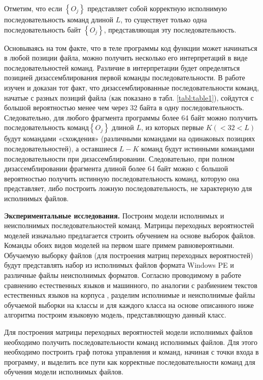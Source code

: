 \documentclass{book}
\begin{document}
Отметим, что если \( \left\lbrace O_{j} \right\rbrace \) представляет собой корректную исполнимую 
последовательность команд длиной $L$, то существует только одна последовательность байт \( \left\lbrace O_{j} \right\rbrace \), 
представляющая эту последовательность.

Основываясь на том факте, что в теле программы код функции может начинаться в
любой позиции файла, можно получить несколько его интерпретаций в виде последовательностей команд. 
Различие в интерпретации будет определяться позицией дизассемблирования первой команды последовательности. 
В работе \cite{Rosenblum} 
изучен и доказан тот факт, что дизассемблированные последовательности команд, начатые 
с разных позиций файла (как показано в табл. \ref{tabl:table1}), сойдутся с большой вероятностью менее чем через 32 
байта в одну последовательность. Следовательно, для любого фрагмента программы более 64 байт можно 
получить последовательность команд\( \left\lbrace O_{j} \right\rbrace \) длиной $L$, из которых 
первые \(K (< 32 < L)\) будут командами «схождения» (различными командами на одинаковых позициях 
последовательностей), а оставшиеся \(L - K\) команд будут истинными командами последовательности 
при дизассемблировании. Следовательно, при полном дизассемблировании фрагмента длиной более 64 байт можно 
с большой вероятностью получить истинную последовательность команд, которую она представляет, либо построить 
ложную последовательность, не характерную для исполнимых файлов.

\textbf{Экспериментальные исследования.} Построим модели исполнимых и неисполнимых последовательностей команд. 
Матрицы переходных вероятностей моделей изначально предлагается строить обучением на основе выборок файлов. 
Команды обоих видов моделей на первом шаге примем равновероятными. Обучаемую выборку файлов (для построения 
матриц переходных вероятностей) будут представлять набор из исполнимых файлов формата Windows PE и 
различные файлы неисполнимых форматов. Согласно проводимому в работе сравнению естественных языков и 
машинного, по аналогии с разбиением текстов естественных языков на корпуса \cite{Silic}
, разделим исполнимые и 
неисполнимые файлы обучаемой выборки на классы и для каждого класса на основе описанного ниже алгоритма 
построим языковую модель, представляющую данный класс.

Для построения матрицы переходных вероятностей модели исполнимых файлов необходимо получить 
последовательности команд исполнимых файлов. Для этого необходимо построить граф потока управления и 
команд, начиная с точки входа в программу, и выделить все пути как корректные последовательности 
команд для обучения модели исполнимых файлов.
\end{document}
